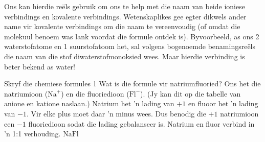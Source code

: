 	\par
\label{m38708*eip-163}Ons kan hierdie reëls gebruik om ons te help met die naam van beide ioniese verbindings en kovalente verbindings. Wetenskaplikes gee egter dikwels ander name vir kovalente verbindings om die naam te vereenvoudig (of omdat die molekuul benoem was lank voordat die formule ontdek is). Byvoorbeeld, as ons 2 waterstofatome en 1 suurstofatoom het, sal volgens bogenoemde benamingsreëls die naam van die stof diwaterstofmonoksied wees. Maar hierdie verbinding is beter bekend as water!  \par \label{m38708*eip-254} \vspace{-1cm} 
\begin{wex}{Skryf die chemiese formules 1}
{Wat is die formule vir natriumfluoried? 
\vspace{5pt}}
{
Ons het die natriumioon ($\text{Na}^{+}$) en die fluoriedioon ($\text{Fl}^{-}$). (Jy kan dit op die tabelle van anione en katione naslaan.)
Natrium het 'n lading van $+1$ en fluoor het 'n lading van $-1$.
Vir elke plus moet daar 'n minus wees. Dus benodig die $+1$ natriumioon een $-1$ fluoriedioon sodat die lading gebalanseer is. Natrium en fluor verbind in 'n 1:1 verhouding.
$\text{NaFl}$
}
\end{wex}
